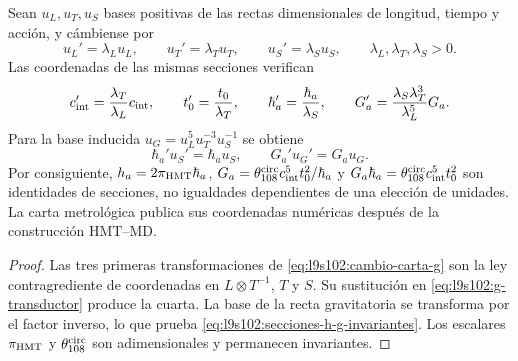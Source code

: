 \begin{theorem}
\label{thm:l9s102:covariancia-unidades-g}
Sean \(u_L,u_T,u_S\) bases positivas de las rectas dimensionales de
longitud, tiempo y acción, y cámbiense por
\[
 u_L'=\lambda_Lu_L,\qquad
 u_T'=\lambda_Tu_T,\qquad
 u_S'=\lambda_Su_S,
 \qquad \lambda_L,\lambda_T,\lambda_S>0.
\]
Las coordenadas de las mismas secciones verifican
\begin{equation}
 c_{\rm int}'=\frac{\lambda_T}{\lambda_L}c_{\rm int},\qquad
 t_0'=\frac{t_0}{\lambda_T},\qquad
 \hbar_a'=\frac{\hbar_a}{\lambda_S},\qquad
 G_a'=\frac{\lambda_S\lambda_T^3}{\lambda_L^5}G_a.
 \label{eq:l9s102:cambio-carta-g}
\end{equation}
Para la base inducida
\(u_G=u_L^5u_T^{-3}u_S^{-1}\) se obtiene
\begin{equation}
 \hbar_a'u_S'=\hbar_au_S,
 \qquad G_a'u_G'=G_au_G.
 \label{eq:l9s102:secciones-h-g-invariantes}
\end{equation}
Por consiguiente,
\(h_a=2\pi_{\rm HMT}\hbar_a\),
\(G_a=\theta_{108}^{\rm circ}c_{\rm int}^5t_0^2/\hbar_a\) y
\(G_a\hbar_a=\theta_{108}^{\rm circ}c_{\rm int}^5t_0^2\)
son identidades de secciones, no igualdades dependientes de una elección de
unidades. La carta metrológica publica sus coordenadas numéricas después de
la construcción HMT--MD.
\end{theorem}

\begin{proof}
Las tres primeras transformaciones de
\eqref{eq:l9s102:cambio-carta-g} son la ley contragrediente de coordenadas
en \(L\otimes T^{-1}\), \(T\) y \(S\). Su sustitución en
\eqref{eq:l9s102:g-transductor} produce la cuarta. La base de la recta
gravitatoria se transforma por el factor inverso, lo que prueba
\eqref{eq:l9s102:secciones-h-g-invariantes}. Los escalares
\(\pi_{\rm HMT}\) y \(\theta_{108}^{\rm circ}\) son adimensionales y
permanecen invariantes.
\end{proof}
